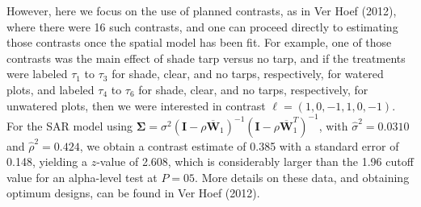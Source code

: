 \documentclass[12pt, titlepage]{article}
\begin{document}
However, here we focus on the use of planned contrasts, as in Ver Hoef (2012), where there were 16 such contrasts, and one can proceed directly to estimating those contrasts once the spatial model has been fit.  For example, one of those contrasts was the main effect of shade tarp versus no tarp, and if the treatments were labeled $\tau_{1}$ to $\tau_{3}$ for shade, clear, and no tarps, respectively, for watered plots, and labeled $\tau_{4}$ to $\tau_{6}$ for shade, clear, and no tarps, respectively, for unwatered plots, then we were interested in contrast $\ell = (1, 0, -1, 1, 0, -1)$. For the SAR model using $\boldsymbol{\Sigma} = \sigma^{2}(\mathbf{I} - \rho\overline{\mathbf{W}}_{1})^{-1}(\mathbf{I} - \rho\overline{\mathbf{W}}_{1}^{T})^{-1}$, with $\hat{\sigma}^{2} = 0.0310$ and $\hat{\rho}^{2} = 0.424$, we obtain a contrast estimate of 0.385 with a standard error of 0.148, yielding a $z$-value of 2.608, which is considerably larger than the 1.96 cutoff value for an alpha-level test at $P = 05$.  More details on these data, and obtaining optimum designs, can be found in Ver Hoef (2012).








%


%
%
\end{document}
